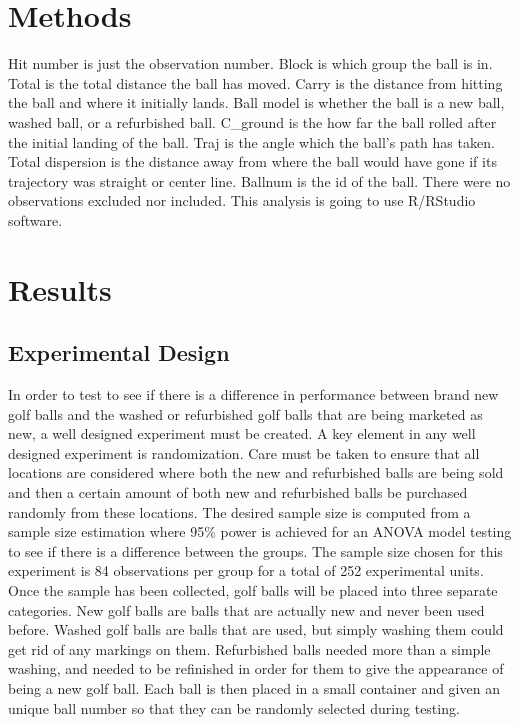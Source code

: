 \documentclass{article}\usepackage[]{graphicx}\usepackage[]{color}
\begin{document}
\section*{Methods}

Hit number is just the observation number. Block is which group the ball is in. Total is the total distance the ball has moved. Carry is the distance from hitting the ball and where it initially lands. Ball model is whether the ball is a new ball, washed ball, or a refurbished ball. C\_ground is the how far the ball rolled after the initial landing of the ball. Traj is the angle which the ball's path has taken. Total dispersion is the distance away from where the ball would have gone if its trajectory was straight or center line. Ballnum is the id of the ball. 
There were no observations excluded nor included. This analysis is going to use R/RStudio software.

\section*{Results}
\subsection*{Experimental Design}

In order to test to see if there is a difference in performance between brand new golf balls and the washed or refurbished golf balls that are being marketed as new, a well designed experiment must be created. A key element in any well designed experiment is randomization. Care must be taken to ensure that all locations are considered where both the new and refurbished balls are being sold and then a certain amount of both new and refurbished balls be purchased randomly from these locations. The desired sample size is computed from a sample size estimation where 95\% power is achieved for an ANOVA model testing to see if there is a difference between the groups. The sample size chosen for this experiment is 84 observations per group for a total of 252 experimental units. Once the sample has been collected, golf balls will be placed into three separate categories. New golf balls are balls that are actually new and never been used before. Washed golf balls are balls that are used, but simply washing them could get rid of any markings on them. Refurbished balls needed more than a simple washing, and needed to be refinished in order for them to give the appearance of being a new golf ball. Each ball is then placed in a small container and given an unique ball number so that they can be randomly selected during testing.
\end{document}
